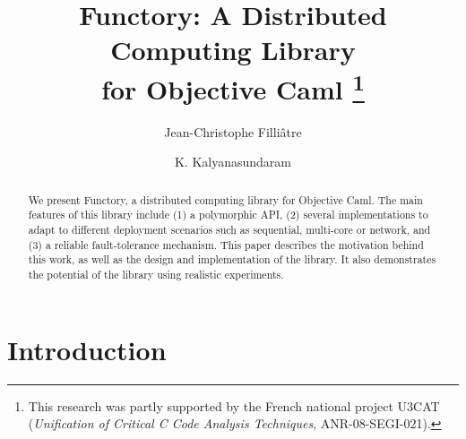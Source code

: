 \documentclass{llncs}
\newcommand{\Ocaml}{OCaml}
\newcommand{\functory}{\textsf{Functory}}
\begin{document}
\title{Functory: A Distributed Computing Library \\ for Objective Caml 
\thanks{This
    research was partly supported by the French national project U3CAT
    (\emph{Unification of Critical C Code Analysis Techniques},
    ANR-08-SEGI-021).}}

\author{Jean-Christophe Filli\^{a}tre \and K. Kalyanasundaram}


\maketitle

\begin{abstract}
  We present Functory, a distributed computing library for
  Objective Caml. The main features of this library
  include (1) a polymorphic API, (2) several implementations to
  adapt to different deployment scenarios such as sequential,
  multi-core or network, and (3) a reliable fault-tolerance mechanism.
  This paper describes the motivation behind this work, as well as
  the design and implementation of the library. It also demonstrates
  the potential of the library using realistic experiments.
\end{abstract}


\section{Introduction}

\end{document}
